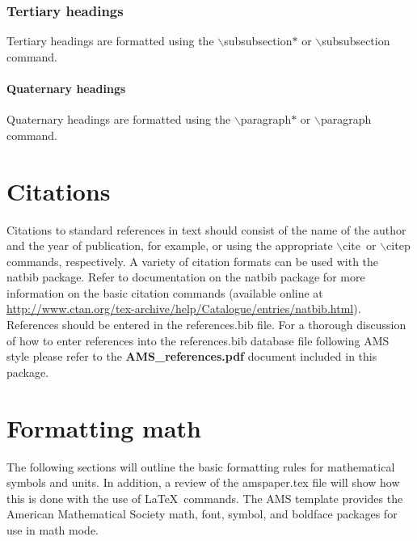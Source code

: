 \documentclass[12pt]{article}
\begin{document}
\subsubsection*{Tertiary headings} %
Tertiary headings are formatted using the $\backslash$subsubsection$*$ or $\backslash$subsubsection command.

\paragraph*{Quaternary headings} %
Quaternary headings are formatted using the $\backslash$paragraph$*$ or $\backslash$paragraph command.

\section{Citations}
Citations to standard references in text should consist of the name of the author and the year of publication, for example, \cite{Becker+Schmitz2003} or \citep{Becker+Schmitz2003} using the appropriate $\backslash$cite\ or $\backslash$citep commands, respectively. A variety of citation formats can be used with the natbib package. Refer to documentation on the natbib package for more information on the basic citation commands (available online at \url{http://www.ctan.org/tex-archive/help/Catalogue/entries/natbib.html}). References should be entered in the references.bib file. For a thorough discussion of how to enter references into the references.bib database file following AMS style please refer to the \textbf{AMS\_references.pdf} document included in this package.

\section{Formatting math}
The following sections will outline the basic formatting rules for mathematical symbols and units.  In addition, a review of the amspaper.tex file will show how this is done with the use of \LaTeX\ commands.  The AMS template provides the American Mathematical Society math, font, symbol, and boldface packages for use in math mode.
\end{document}
